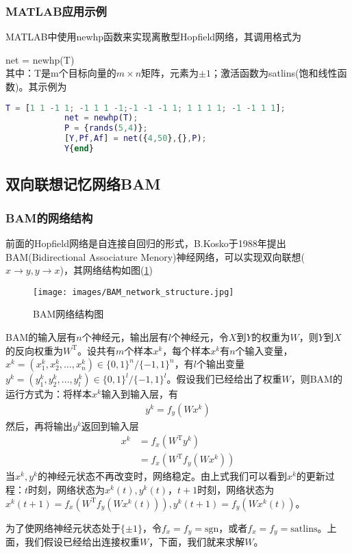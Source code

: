         \subsubsection{MATLAB应用示例}
            \par
            MATLAB中使用newhp函数来实现离散型Hopfield网络，其调用格式为
            \par
            net = newhp(T)\\
            其中：T是m个目标向量的$m\times n$矩阵，元素为$\pm 1$；激活函数为satlins(饱和线性函数)。其示例为
            \begin{lstlisting}[language = Matlab]
            T = [1 1 -1 1; -1 1 1 -1;-1 -1 -1 1; 1 1 1 1; -1 -1 1 1];
            net = newhp(T);
            P = {rands(5,4)};
            [Y,Pf,Af] = net({4,50},{},P);
            Y{end}
            \end{lstlisting}

    \subsection{双向联想记忆网络BAM}
        \subsubsection{BAM的网络结构}
            \par
            前面的Hopfield网络是自连接自回归的形式，B.Kosko于1988年提出BAM(Bidirectional Associature Menory)神经网络，可以实现双向联想($x\to y,y\to x$)，其网络结构如图(\ref{fig:BAM网络结构图})
            \begin{figure}[H]
            \centering
            \texttt{[image: images/BAM\_network\_structure.jpg]}
            \caption{BAM网络结构图}
            \label{fig:BAM网络结构图}
            \end{figure}
            BAM的输入层有$n$个神经元，输出层有$l$个神经元，令$X$到$Y$的权重为$W$，则$Y$到$X$的反向权重为$W^\mathrm{T}$。设共有$m$个样本$x^k$，每个样本$x^k$有$n$个输入变量，$x^k = (x_1^k,x_2^k,\dots,x_n^k)\in \{0,1\}^n/\{-1,1\}^n$，有$l$个输出变量$y^k=(y_1^k,y_2^k,\dots,y_l^k)\in \{0,1\}^l/\{-1,1\}^l$。假设我们已经给出了权重$W$，则BAM的运行方式为：将样本$x^k$输入到输入层，有
            \begin{align*}
            y^k = f_y(W x^k)
            \end{align*}
            然后，再将输出$y^k$返回到输入层
            \begin{align*}
            x^k & = f_x(W^\mathrm{T}y^k)\\
            & = f_x \left( W^\mathrm{T}f_y(W x^k) \right)
            \end{align*}
            当$x^k,y^k$的神经元状态不再改变时，网络稳定。由上式我们可以看到$x^k$的更新过程：$t$时刻，网络状态为$x^k(t),y^k(t)$，$t+1$时刻，网络状态为$x^k(t+1) = f_x \left( W^\mathrm{T}f_y(W x^k(t)) \right) ,y^k(t+1) = f_y(W x^k(t))$。
            \par
            为了使网络神经元状态处于$\{\pm 1\}$，令$f_x = f_y = \mathrm{sgn}$，或者$f_x = f_y = \mathrm{satlins}$。上面，我们假设已经给出连接权重$W$，下面，我们就来求解$W$。
